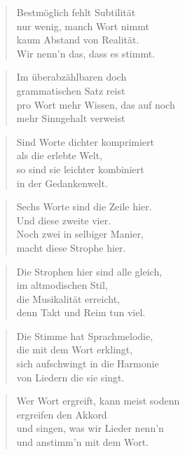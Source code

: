 \documentclass[10pt,a4paper]{article}
\begin{document}
\begin{multicols}{2}
\begin{verse}
Bestmöglich fehlt Subtilität \\
nur wenig, manch Wort nimmt \\
kaum Abstand von Realität. \\
Wir nenn’n das, dass es stimmt. \\
\end{verse}

\begin{verse}
Im überabzählbaren doch \\
grammatischen Satz reist \\
pro Wort mehr Wissen, das auf noch \\
mehr Sinngehalt verweist \\
\end{verse}

\begin{verse}
Sind Worte dichter komprimiert \\
als die erlebte Welt, \\
so sind sie leichter kombiniert \\
in der Gedankenwelt. \\
\end{verse}

\begin{verse}
Sechs Worte sind die Zeile hier. \\
Und diese zweite vier. \\
Noch zwei in selbiger Manier, \\
macht diese Strophe hier. \\
\end{verse}

\begin{verse}
Die Strophen hier sind alle gleich, \\
im altmodischen Stil, \\
die Musikalität erreicht, \\
denn Takt und Reim tun viel. \\
\end{verse}

\begin{verse}
Die Stimme hat Sprachmelodie, \\
die mit dem Wort erklingt, \\
sich aufschwingt in die Harmonie \\
von Liedern die sie singt. \\
\end{verse}

\begin{verse}
Wer Wort ergreift, kann meist sodenn \\
ergreifen den Akkord \\
und singen, was wir Lieder nenn’n \\
und anstimm’n mit dem Wort. \\
\end{verse}


\end{multicols}
\end{document}
